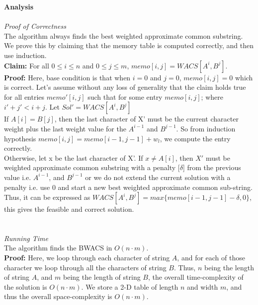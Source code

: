 \documentclass{article}
\begin{document}
\textbf{Analysis}\\\\
\textit{Proof of Correctness}\\
The algorithm always finds the best weighted approximate common substring. We prove this by claiming that the memory table is computed correctly, and then use induction.\\
\textbf{Claim:} For all $0\leq i\leq n$ and $0\leq j\leq m$, $memo[i,j] = WACS[A^i, B^j]$.\\
\textbf{Proof:} Here, base condition is that when $i=0$ and $j=0$, $memo[i,j] = 0$ which is correct. Let's assume without any loss of generality that the claim holds true for all entries $memo'[i, j]$ such that for some entry $memo[i, j]$; where $i'+j' < i+j$. Let $Sol' = WACS[A^i, B^j]$\\
If $A[i]=B[j]$, then the last character of X' must be the current character weight plus the last weight value for the $A^{i-1}$ and $B^{j-1}$. So from induction hypothesis $memo[i,j] = memo[i-1,j-1]+w_l$, we compute the entry correctly.\\
Otherwise, let x be the last character of X'. If $x\neq A[i]$, then $X'$ must be weighted approximate common substring with a penalty [$\delta$] from the previous value i.e. $A^{i-1}$, and $B^{j-1}$ or we do not extend the current solution with a penalty i.e. use 0 and start a new best weighted approximate common sub-string. Thus, it can be expressed as $WACS[A^{i}, B^{j}] = max\{memo[i-1,j-1]-\delta,0\}$, this gives the feasible  and correct solution.\\\\\\
\textit{Running Time}\\ The algorithm finds the BWACS in $O(n\cdot m)$.\\
\textbf{Proof:} Here, we loop through each character of string $A$, and for each of those character we loop through all the characters of string $B$. Thus, $n$ being the length of string $A$, and $m$ being the length of string $B$, the overall time-complexity of the solution is $O(n \cdot m)$. We store a 2-D table of length $n$ and width $m$, and thus the overall space-complexity is $O(n \cdot m)$.\\
\end{document}
